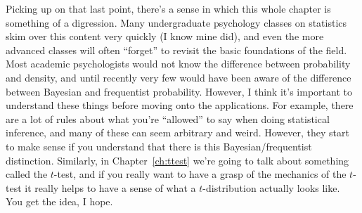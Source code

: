 Picking up on that last point, there's a sense in which this whole chapter is something of a digression. Many undergraduate psychology classes on statistics skim over this content very quickly (I know mine did), and even the more advanced classes will often ``forget'' to revisit the basic foundations of the field. Most academic psychologists would not know the difference between probability and density, and until recently very few would have been aware of the difference between Bayesian and frequentist probability. However, I think it's important to understand these things before moving onto the applications. For example, there are a lot of rules about what you're ``allowed'' to say when doing statistical inference, and many of these can seem arbitrary and weird. However, they start to make sense if you understand that there is this Bayesian/frequentist distinction. Similarly, in Chapter~\ref{ch:ttest} we're going to talk about something called the $t$-test, and if you really want to have a grasp of the mechanics of the $t$-test it really helps to have a sense of what a $t$-distribution actually looks like. You get the idea, I hope.






